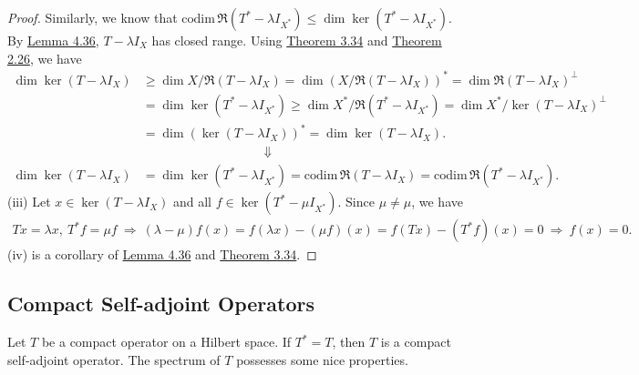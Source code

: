 \documentclass{article}
\begin{document}
\begin{proof}
Similarly, we know that $\mathrm{codim}\,\mathfrak{R}(T^*-\lambda I_{X^*})\leq\dim\ker(T^*-\lambda I_{X^*})$. By \hyperref[lemma:4.36]{Lemma 4.36}, $T-\lambda I_X$ has closed range. Using \hyperref[thm:3.34]{Theorem 3.34} and \hyperref[thm:2.26]{Theorem 2.26}, we have
\begin{align*}
	\dim\ker(T-\lambda I_X) &\geq \dim X/\mathfrak{R}(T-\lambda I_X) = \dim \left(X/\mathfrak{R}(T-\lambda I_X)\right)^* = \dim\mathfrak{R}(T-\lambda I_X)^\perp\\
	&= \dim\ker(T^*-\lambda I_{X^*}) \geq \dim X^*/\mathfrak{R}(T^*-\lambda I_{X^*}) = \dim X^*/\ker(T-\lambda I_X)^\perp\\
	&= \dim\left(\ker(T-\lambda I_X)\right)^* = \dim\ker(T-\lambda I_X).\\
	&\hspace{4cm}\Downarrow\\
	\dim\ker(T-\lambda I_X) &= \dim\ker(T^*-\lambda I_{X^*}) = \mathrm{codim}\,\mathfrak{R}(T-\lambda I_X) = \mathrm{codim}\,\mathfrak{R}(T^*-\lambda I_{X^*}).
\end{align*}
(iii) Let $x\in\ker(T-\lambda I_X)$ and all $f\in\ker(T^*-\mu I_{X^*})$. Since $\mu\neq\mu$, we have
\begin{align*}
	Tx = \lambda x,\ T^* f = \mu f\ \Rightarrow\ (\lambda - \mu)f(x) = f(\lambda x) - (\mu f)(x) = f(Tx) - (T^*f)(x)= 0\ \Rightarrow\ f(x)=0.
\end{align*}
(iv) is a corollary of \hyperref[lemma:4.36]{Lemma 4.36} and \hyperref[thm:3.34]{Theorem 3.34}.
\end{proof}

\newpage
\subsection{Compact Self-adjoint Operators}
Let $T$ be a compact operator on a Hilbert space. If $T^*=T$, then $T$ is a compact self-adjoint operator. The spectrum of $T$ possesses some nice properties.
\end{document}
